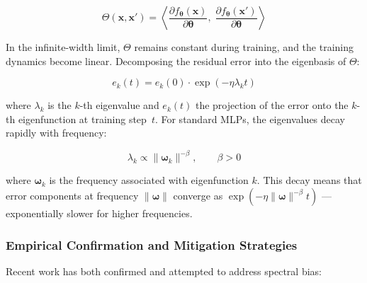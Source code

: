 \begin{equation}
    \Theta(\mathbf{x}, \mathbf{x}')
    = \left\langle
        \frac{\partial f_{\boldsymbol{\theta}}(\mathbf{x})}
             {\partial \boldsymbol{\theta}},\;
        \frac{\partial f_{\boldsymbol{\theta}}(\mathbf{x}')}
             {\partial \boldsymbol{\theta}}
      \right\rangle
\end{equation}

In the infinite-width limit, $\Theta$ remains constant during training, and the
training dynamics become linear.  Decomposing the residual error into the
eigenbasis of $\Theta$:

\begin{equation}
    e_k(t) = e_k(0) \cdot \exp(-\eta \lambda_k t)
    \label{eq:ntk_convergence}
\end{equation}

where $\lambda_k$ is the $k$-th eigenvalue and $e_k(t)$ the projection of the
error onto the $k$-th eigenfunction at training step~$t$.  For standard MLPs,
the eigenvalues decay rapidly with frequency:

\begin{equation}
    \lambda_k \propto \|\boldsymbol{\omega}_k\|^{-\beta},
    \qquad \beta > 0
    \label{eq:eigenvalue_decay}
\end{equation}

where $\boldsymbol{\omega}_k$ is the frequency associated with eigenfunction
$k$.  This decay means that error components at frequency
$\|\boldsymbol{\omega}\|$ converge as
$\exp(-\eta \|\boldsymbol{\omega}\|^{-\beta} t)$ --- exponentially slower for
higher frequencies.

\subsubsection{Empirical Confirmation and Mitigation Strategies}

Recent work has both confirmed and attempted to address spectral bias:

